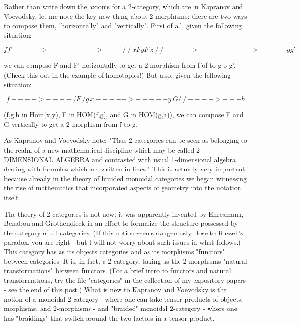 Rather than write down the axioms for a 2-category, which are in
Kapranov and Voevodsky, let me note the key new thing about 2-morphisms:
there are two ways to compose them, "horizontally" and "vertically".
First of all, given the following situation:


$$

                      f           f'
                  ---->---    ---->---
                 /         \ /         \
                x     F     y     F'    z
                 \         / \         /
                  ---->----   ---->----
                      g           g'
$$
    

we can compose F and F' horizontally to get a 2-morphism from  f'of  to
g o g'.  (Check this out in the example of homotopies!)  But also, given
the following situation:


$$

                          f
                      ---->----
                     /  F      \
                    /     g     \
                   x ----->----- y
                    \   G       /
                     \         /
                      ---->---
                          h
$$
    

(f,g,h in Hom(x,y), F in HOM(f,g), and G in HOM(g,h)), we can
compose F and G vertically to get a 2-morphism from f to g.  

As Kapranov and Voevodsky note: "Thus 2-categories can be seen as
belonging to the realm of a new mathematical discipline which may be
called 2-DIMENSIONAL ALGEBRA and contrasted with usual 1-dimensional
algebra dealing with formulas which are written in lines."  This is
actually very important because already in the theory of braided
monoidal categories we began witnessing the rise of mathematics that
incorporated aspects of geometry into the notation itself. 

The theory of 2-categories is not new; it was apparently invented by
Ehresmann, Benabou and Grothendieck in an effort to formalize the
structure possessed by the category of all categories.  (If this notion
seems dangerously close to Russell's paradox, you are right - but I will
not worry about such issues in what follows.)  This category has as its
objects categories and as its morphisms "functors" between categories.  It
is, in fact, a 2-category, taking as the 2-morphisms "natural
transformations" between functors.  (For a brief intro to functors and
natural transformations, try the file "categories" in the collection of
my expository papers - see the end of this post.)  What is new to
Kapranov and Voevodsky is the notion of a monoidal 2-category -
where one can take tensor products of objects, morphisms, and
2-morphisms - and "braided" monoidal 2-category - where one has
"braidings" that switch around the two factors in a tensor product.  

